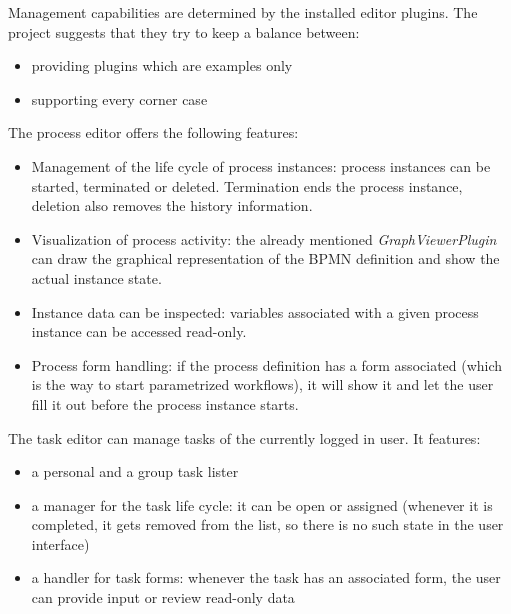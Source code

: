 Management capabilities are determined by the installed editor plugins. The
project suggests that they try to keep a balance between:

\begin{itemize}
\item providing plugins which are examples only
\item supporting every corner case
\end{itemize}

The process editor offers the following features:

\begin{itemize}
\item Management of the life cycle of process instances: process instances can
be started, terminated or deleted. Termination ends the process instance,
deletion also removes the history information.
\item Visualization of process activity: the already mentioned
\emph{GraphViewerPlugin} can draw the graphical representation of the BPMN
definition and show the actual instance state.
\item Instance data can be inspected: variables associated with a given process
instance can be accessed read-only.
\item Process form handling: if the process definition has a form associated
(which is the way to start parametrized workflows), it will show it and let
the user fill it out before the process instance starts.
\end{itemize}

The task editor can manage tasks of the currently logged in user. It features:

\begin{itemize}
\item a personal and a group task lister
\item a manager for the task life cycle: it can be open or assigned (whenever it is completed, it gets removed from the list, so there is no such state in the user interface)
\item a handler for task forms: whenever the task has an associated form, the user can provide input or review read-only data
\end{itemize}
